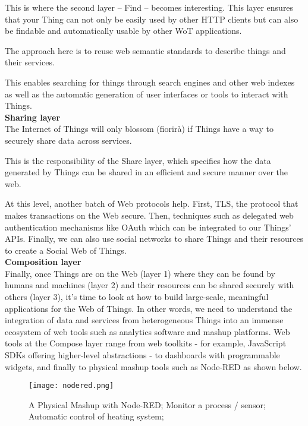 This is where the second layer – Find – becomes interesting.
This layer ensures that your Thing can not only be easily used by other HTTP
clients but can also be findable and automatically usable by other WoT
applications.

The approach here is to reuse web semantic standards to describe things and
their services.

This enables searching for things through search engines and other web indexes
as well as the automatic generation of user interfaces or tools to interact
with Things.\\

\textbf{Sharing layer}\\

The Internet of Things will only blossom (fiorirà) if Things have a way to
securely share data across services.

This is the responsibility of the Share layer, which specifies how the data
generated by Things can be shared in an efficient and secure manner over
the web.

At this level, another batch of Web protocols help.
First, TLS, the protocol that makes transactions on the Web secure.
Then, techniques such as delegated web authentication mechanisms like OAuth
which can be integrated to our Things' APIs. Finally, we can also use social
networks to share Things and their resources to create a Social Web of
Things.\\

\textbf{Composition layer}\\

Finally, once Things are on the Web (layer 1) where they can be found by humans
and machines (layer 2) and their resources can be shared securely with others
(layer 3), it's time to look at how to build large-scale, meaningful
applications for the Web of Things. In other words, we need to understand the
integration of data and services from heterogeneous Things into an immense
ecosystem of web tools such as analytics software and mashup platforms.
Web tools at the Compose layer range from web toolkits - for example,
JavaScript SDKs offering higher-level abstractions - to dashboards with
programmable widgets, and finally to physical mashup tools such as Node-RED as
shown below.

\begin{figure}[H]
  \centering
  \texttt{[image: nodered.png]}
  \caption{A Physical Mashup with Node-RED;
Monitor a process / sensor;
Automatic control of heating system;}
  \label{fig:nodered}
\end{figure}

